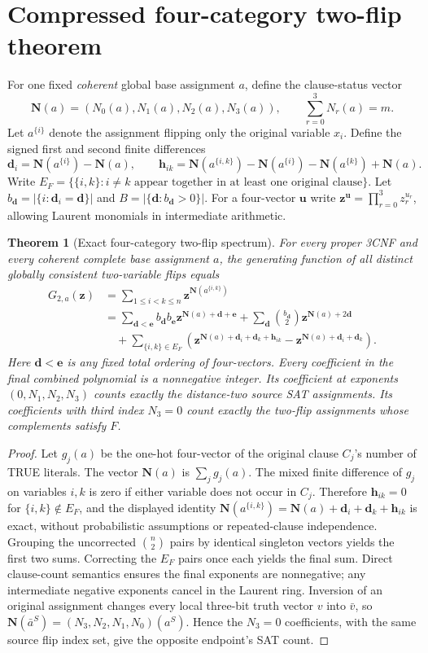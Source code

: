 \documentclass[10pt]{article}
\newtheorem{theorem}{Theorem}
\newcommand{\vN}{\mathbf N}
\newcommand{\bd}{\mathbf d}
\newcommand{\bh}{\mathbf h}
\begin{document}
\section{Compressed four-category two-flip theorem}
For one fixed \emph{coherent} global base assignment $a$, define the clause-status vector
\[
\vN(a)=(N_0(a),N_1(a),N_2(a),N_3(a)),\qquad \sum_{r=0}^3N_r(a)=m.
\]
Let $a^{\{i\}}$ denote the assignment flipping only the original variable $x_i$. Define the signed first and second finite differences
\[
\bd_i=\vN(a^{\{i\}})-\vN(a),\qquad
\bh_{ik}=\vN(a^{\{i,k\}})-\vN(a^{\{i\}})-\vN(a^{\{k\}})+\vN(a).
\]
Write $E_F=\{\{i,k\}:i\ne k\text{ appear together in at least one original clause}\}$. Let $b_{\bd}=|\{i:\bd_i=\bd\}|$ and $B=|\{\bd:b_{\bd}>0\}|$. For a four-vector $\mathbf u$ write $\mathbf z^{\mathbf u}=\prod_{r=0}^3z_r^{u_r}$, allowing Laurent monomials in intermediate arithmetic.

\begin{theorem}[Exact four-category two-flip spectrum]\label{thm:spectrum}
For every proper 3CNF and every coherent complete base assignment $a$, the generating function of \emph{all} distinct globally consistent two-variable flips equals
\begin{align*}
G_{2,a}(\mathbf z)&=\sum_{1\le i<k\le n}\mathbf z^{\vN(a^{\{i,k\}})}\\
&=\sum_{\bd<\mathbf e}b_{\bd}b_{\mathbf e}\mathbf z^{\vN(a)+\bd+\mathbf e}
 +\sum_{\bd}\binom{b_{\bd}}2\mathbf z^{\vN(a)+2\bd}\\
&\quad+\sum_{\{i,k\}\in E_F}\left(\mathbf z^{\vN(a)+\bd_i+\bd_k+\bh_{ik}}-
                     \mathbf z^{\vN(a)+\bd_i+\bd_k}\right).
\end{align*}
Here $\bd<\mathbf e$ is any fixed total ordering of four-vectors. Every coefficient in the final combined polynomial is a nonnegative integer. Its coefficient at exponents $(0,N_1,N_2,N_3)$ counts exactly the distance-two source SAT assignments. Its coefficients with third index $N_3=0$ count exactly the two-flip assignments whose \emph{complements} satisfy $F$.
\end{theorem}
\begin{proof}
Let $g_j(a)$ be the one-hot four-vector of the original clause $C_j$'s number of TRUE literals. The vector $\vN(a)$ is $\sum_jg_j(a)$. The mixed finite difference of $g_j$ on variables $i,k$ is zero if either variable does not occur in $C_j$. Therefore $\bh_{ik}=0$ for $\{i,k\}\notin E_F$, and the displayed identity $\vN(a^{\{i,k\}})=\vN(a)+\bd_i+\bd_k+\bh_{ik}$ is exact, without probabilistic assumptions or repeated-clause independence. Grouping the uncorrected $\binom n2$ pairs by identical singleton vectors yields the first two sums. Correcting the $E_F$ pairs once each yields the final sum. Direct clause-count semantics ensures the final exponents are nonnegative; any intermediate negative exponents cancel in the Laurent ring. Inversion of an original assignment changes every local three-bit truth vector $v$ into $\bar v$, so $\vN(\bar a^{S})=(N_3,N_2,N_1,N_0)(a^{S})$. Hence the $N_3=0$ coefficients, with the same source flip index set, give the opposite endpoint's SAT count.
\end{proof}
\end{document}
